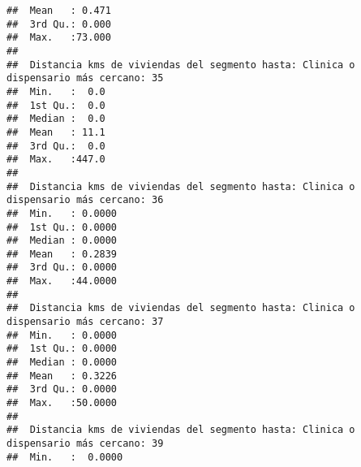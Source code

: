 \documentclass[11pt,]{article}
\begin{document}
\begin{verbatim}
##  Mean   : 0.471                                                                      
##  3rd Qu.: 0.000                                                                      
##  Max.   :73.000                                                                      
##                                                                                      
##  Distancia kms de viviendas del segmento hasta: Clinica o dispensario más cercano: 35
##  Min.   :  0.0                                                                       
##  1st Qu.:  0.0                                                                       
##  Median :  0.0                                                                       
##  Mean   : 11.1                                                                       
##  3rd Qu.:  0.0                                                                       
##  Max.   :447.0                                                                       
##                                                                                      
##  Distancia kms de viviendas del segmento hasta: Clinica o dispensario más cercano: 36
##  Min.   : 0.0000                                                                     
##  1st Qu.: 0.0000                                                                     
##  Median : 0.0000                                                                     
##  Mean   : 0.2839                                                                     
##  3rd Qu.: 0.0000                                                                     
##  Max.   :44.0000                                                                     
##                                                                                      
##  Distancia kms de viviendas del segmento hasta: Clinica o dispensario más cercano: 37
##  Min.   : 0.0000                                                                     
##  1st Qu.: 0.0000                                                                     
##  Median : 0.0000                                                                     
##  Mean   : 0.3226                                                                     
##  3rd Qu.: 0.0000                                                                     
##  Max.   :50.0000                                                                     
##                                                                                      
##  Distancia kms de viviendas del segmento hasta: Clinica o dispensario más cercano: 39
##  Min.   :  0.0000                                                                    

\end{verbatim}
\end{document}
